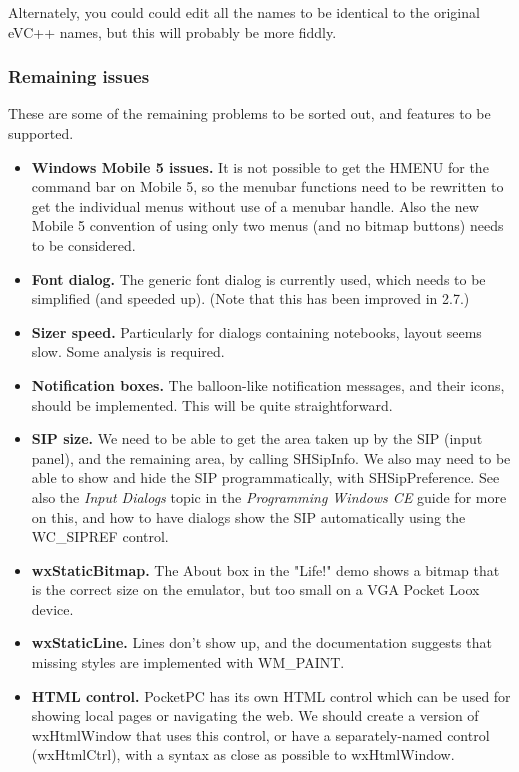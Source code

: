 Alternately, you could could edit all the names to be identical to the original eVC++
names, but this will probably be more fiddly.

\subsubsection{Remaining issues}

These are some of the remaining problems to be sorted out, and features
to be supported.

\itemsep=0pt
\begin{itemize}
\item {\bf Windows Mobile 5 issues.} It is not possible to get the HMENU for
the command bar on Mobile 5, so the menubar functions need to be rewritten
to get the individual menus without use of a menubar handle. Also the
new Mobile 5 convention of using only two menus (and no bitmap buttons) needs to be
considered.
\item {\bf Font dialog.} The generic font dialog is currently used, which
needs to be simplified (and speeded up). (Note that this has been improved in 2.7.)
\item {\bf Sizer speed.} Particularly for dialogs containing notebooks,
layout seems slow. Some analysis is required.
\item {\bf Notification boxes.} The balloon-like notification messages, and their
icons, should be implemented. This will be quite straightforward.
\item {\bf SIP size.} We need to be able to get the area taken up by the SIP (input panel),
and the remaining area, by calling SHSipInfo. We also may need to be able to show and hide
the SIP programmatically, with SHSipPreference. See also the {\it Input Dialogs} topic in
the {\it Programming Windows CE} guide for more on this, and how to have dialogs
show the SIP automatically using the WC\_SIPREF control.
\item {\bf wxStaticBitmap.} The About box in the "Life!" demo shows a bitmap that is
the correct size on the emulator, but too small on a VGA Pocket Loox device.
\item {\bf wxStaticLine.} Lines don't show up, and the documentation suggests that
missing styles are implemented with WM\_PAINT.
\item {\bf HTML control.} PocketPC has its own HTML control which can be used for showing
local pages or navigating the web. We should create a version of wxHtmlWindow that uses this
control, or have a separately-named control (wxHtmlCtrl), with a syntax as close as possible to wxHtmlWindow.

\end{itemize}
